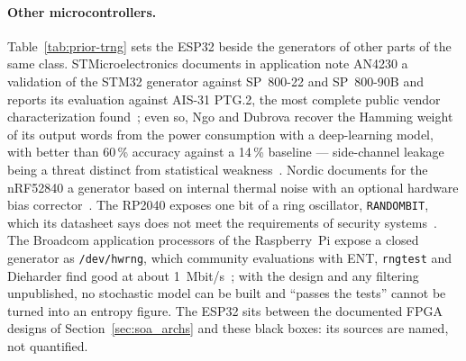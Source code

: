 \paragraph{Other microcontrollers.} Table~\ref{tab:prior-trng} sets the
ESP32 beside the generators of other parts of the same class.
STMicroelectronics documents in application note AN4230 a validation of
the STM32 generator against SP~800-22 and SP~800-90B and reports its
evaluation against AIS-31 PTG.2, the most complete public vendor
characterization found~\cite{stm_an4230}; even so, Ngo and Dubrova
recover the Hamming weight of its output words from the power consumption
with a deep-learning model, with better than 60\,\% accuracy against a
14\,\% baseline --- side-channel leakage being a threat distinct from
statistical weakness~\cite{ngo_2022_sidechannel}. Nordic documents for the
nRF52840 a generator based on internal thermal noise with an optional
hardware bias corrector~\cite{nordic_nrf52840_rng}. The RP2040 exposes one
bit of a ring oscillator, \texttt{RANDOMBIT}, which its datasheet says does
not meet the requirements of security systems~\cite{raspberrypi_rp2040_ds,
dmo_2022_rp2040}. The Broadcom application processors of the Raspberry~Pi
expose a closed generator as \texttt{/dev/hwrng}, which community
evaluations with ENT, \texttt{rngtest} and Dieharder find good at about
1~Mbit/s~\cite{russell_2013_rpi_hwrng}; with the design and any filtering
unpublished, no stochastic model can be built and ``passes the tests'' cannot
be turned into an entropy figure. The ESP32 sits between the documented
FPGA designs of Section~\ref{sec:soa_archs} and these black boxes: its
sources are named, not quantified.

